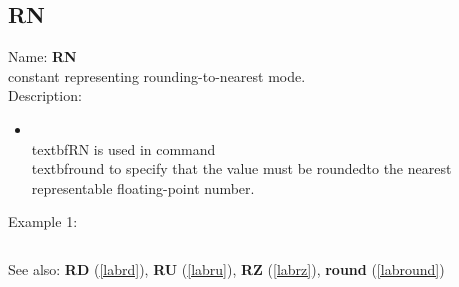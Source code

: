 \subsection{RN}
\label{labrn}
\noindent Name: \textbf{RN}\\
constant representing rounding-to-nearest mode.\\
\noindent Description: \begin{itemize}

\item \\textbf{RN} is used in command \\textbf{round} to specify that the value must be rounded\n   to the nearest representable floating-point number.\n\end{itemize}
\noindent Example 1: 
\begin{center}\begin{minipage}{15cm}\begin{Verbatim}[frame=single]
\end{Verbatim}
\end{minipage}\end{center}
See also: \textbf{RD} (\ref{labrd}), \textbf{RU} (\ref{labru}), \textbf{RZ} (\ref{labrz}), \textbf{round} (\ref{labround})
